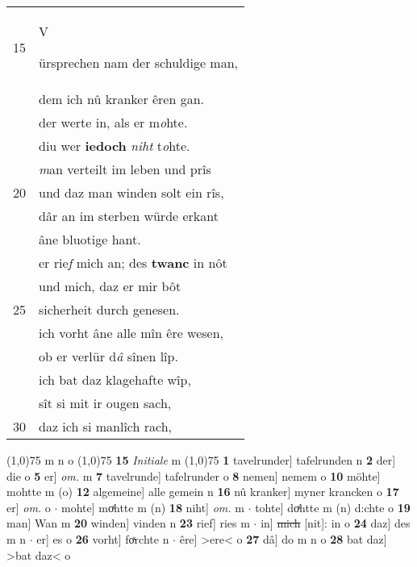 \documentclass[8pt,a4paper,notitlepage]{article}
\begin{document}
\begin{table}[ht]
\begin{minipage}[t]{0.5\linewidth}
\begin{tabular}{rl}
15 & \begin{large}V\end{large}ürsprechen nam der schuldige man,\\ 
 & dem ich nû kranker êren gan.\\ 
 & der werte in, als er m\textit{o}hte.\\ 
 & diu wer \textbf{iedoch} \textit{niht} t\textit{o}hte.\\ 
 & \textit{m}an verteilt im leben und prîs\\ 
20 & und daz man winden solt ein rîs,\\ 
 & dâr an im sterben würde erkant\\ 
 & âne bluotige hant.\\ 
 & er rie\textit{f} mich an; des \textbf{twanc} in nôt\\ 
 & und mich, daz er mir bôt\\ 
25 & sicherheit durch genesen.\\ 
 & ich vorht âne alle mîn êre wesen,\\ 
 & ob er verlür d\textit{â} sînen lîp.\\ 
 & ich bat daz klagehafte wîp,\\ 
 & sît si mit ir ougen sach,\\ 
30 & daz ich si manlîch rach,\\ 
\end{tabular}
\scriptsize
\line(1,0){75} \newline
m n o \newline
\line(1,0){75} \newline
\textbf{15} \textit{Initiale} m  \newline
\line(1,0){75} \newline
\textbf{1} tavelrunder] tafelrunden n \textbf{2} der] die o \textbf{5} er] \textit{om.} m \textbf{7} tavelrunde] tafelrunder o \textbf{8} nemen] nemem o \textbf{10} möhte] mohtte m (o) \textbf{12} algemeine] alle gemein n \textbf{16} nû kranker] myner krancken o \textbf{17} er] \textit{om.} o  $\cdot$ mohte] moͯhtte m (n) \textbf{18} niht] \textit{om.} m  $\cdot$ tohte] doͯhtte m (n) d:chte o \textbf{19} man] Wan m \textbf{20} winden] vinden n \textbf{23} rief] ries m  $\cdot$ in] \sout{mich} [nit]: in o \textbf{24} daz] des m n  $\cdot$ er] es o \textbf{26} vorht] foͯrchte n  $\cdot$ êre] >ere< o \textbf{27} dâ] do m n o \textbf{28} bat daz] >bat daz< o \newline
\end{minipage}
\end{table}
\newpage
\end{document}
